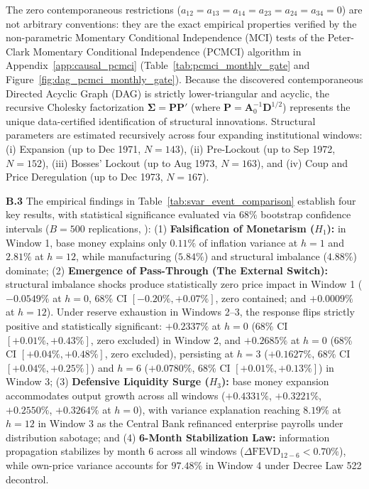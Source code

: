 The zero contemporaneous restrictions ($a_{12} = a_{13} = a_{14} = a_{23} = a_{24} = a_{34} = 0$) are not arbitrary conventions: they are the exact empirical properties verified by the non-parametric Momentary Conditional Independence (MCI) tests of the Peter-Clark Momentary Conditional Independence (PCMCI) algorithm \citep{Runge2019} in Appendix~\ref{app:causal_pcmci} (Table~\ref{tab:pcmci_monthly_gate} and Figure~\ref{fig:dag_pcmci_monthly_gate}). Because the discovered contemporaneous Directed Acyclic Graph (DAG) is strictly lower-triangular and acyclic, the recursive Cholesky factorization $\mathbf{\Sigma} = \mathbf{P} \mathbf{P}'$ (where $\mathbf{P} = \mathbf{A}_0^{-1} \mathbf{D}^{1/2}$) represents the unique data-certified identification of structural innovations. Structural parameters are estimated recursively across four expanding institutional windows: (i) Expansion (up to Dec 1971, $N=143$), (ii) Pre-Lockout (up to Sep 1972, $N=152$), (iii) Bosses' Lockout (up to Aug 1973, $N=163$), and (iv) Coup and Price Deregulation (up to Dec 1973, $N=167$).

\textbf{B.3} The empirical findings in Table~\ref{tab:svar_event_comparison} establish four key results, with statistical significance evaluated via 68\% bootstrap confidence intervals ($B=500$ replications, \citealp{SimsZha1999}): (1) \textbf{Falsification of Monetarism ($H_1$):} in Window 1, base money explains only $0.11\%$ of inflation variance at $h=1$ and $2.81\%$ at $h=12$, while manufacturing ($5.84\%$) and structural imbalance ($4.88\%$) dominate; (2) \textbf{Emergence of Pass-Through (The External Switch):} structural imbalance shocks produce statistically zero price impact in Window 1 ($-0.0549\%$ at $h=0$, 68\% CI $[-0.20\%, +0.07\%]$, zero contained; and $+0.0009\%$ at $h=12$). Under reserve exhaustion in Windows 2--3, the response flips strictly positive and statistically significant: $+0.2337\%$ at $h=0$ (68\% CI $[+0.01\%, +0.43\%]$, zero excluded) in Window 2, and $+0.2685\%$ at $h=0$ (68\% CI $[+0.04\%, +0.48\%]$, zero excluded), persisting at $h=3$ ($+0.1627\%$, 68\% CI $[+0.04\%, +0.25\%]$) and $h=6$ ($+0.0780\%$, 68\% CI $[+0.01\%, +0.13\%]$) in Window 3; (3) \textbf{Defensive Liquidity Surge ($H_3$):} base money expansion accommodates output growth across all windows ($+0.4331\%$, $+0.3221\%$, $+0.2550\%$, $+0.3264\%$ at $h=0$), with variance explanation reaching $8.19\%$ at $h=12$ in Window 3 as the Central Bank refinanced enterprise payrolls under distribution sabotage; and (4) \textbf{6-Month Stabilization Law:} information propagation stabilizes by month 6 across all windows ($\Delta \text{FEVD}_{12-6} < 0.70\%$), while own-price variance accounts for $97.48\%$ in Window 4 under Decree Law 522 decontrol.


